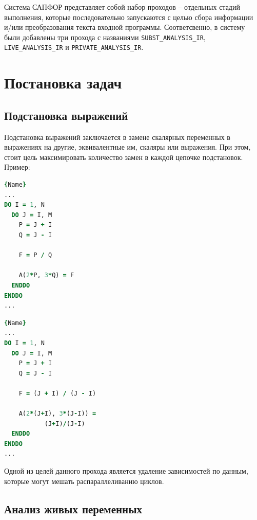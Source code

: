 \documentclass{article}
\begin{document}
Система САПФОР представляет собой набор проходов -- отдельных стадий выполнения, 
которые последовательно запускаются с целью сбора информации и/или преобразования текста входной программы.
Соответсвенно, в систему были добавлены три прохода с названиями \texttt{SUBST\_ANALYSIS\_IR}, \texttt{LIVE\_ANALYSIS\_IR} и \texttt{PRIVATE\_ANALYSIS\_IR}.

\section{Постановка задач}

\subsection{Подстановка выражений}
Подстановка выражений заключается в замене скалярных переменных в выражениях на другие, эквивалентные им, 
скаляры или выражения. При этом, стоит цель максимировать количество замен в каждой цепочке подстановок.
\\[3mm]
Пример:
\\

\noindent\begin{minipage}{.45\textwidth}
    \begin{lstlisting}[language=Fortran, caption=До подстановки,frame=shadowbox]{Name}
...
DO I = 1, N
  DO J = I, M
    P = J + I
    Q = J - I

    F = P / Q

    A(2*P, 3*Q) = F        
  ENDDO
ENDDO
...
\end{lstlisting}
\end{minipage}\hfill
\begin{minipage}{.45\textwidth}
    \begin{lstlisting}[language=Fortran, caption=После подстановки,frame=shadowbox]{Name}
...
DO I = 1, N
  DO J = I, M
    P = J + I
    Q = J - I

    F = (J + I) / (J - I)

    A(2*(J+I), 3*(J-I)) = 
           (J+I)/(J-I)      
  ENDDO
ENDDO
...
\end{lstlisting}
\end{minipage}


Одной из целей данного прохода является удаление зависимостей по данным, которые могут мешать распараллеливанию циклов.


\subsection{Анализ живых переменных}
\end{document}

